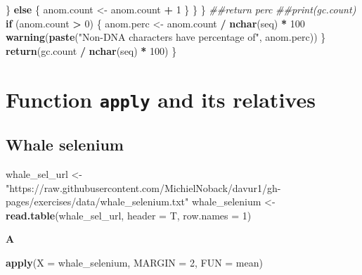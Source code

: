 \documentclass[]{book}
\newenvironment{Shaded}{\begin{snugshade}}{\end{snugshade}}
\newcommand{\CommentTok}[1]{\textcolor[rgb]{0.56,0.35,0.01}{\textit{#1}}}
\newcommand{\ControlFlowTok}[1]{\textcolor[rgb]{0.13,0.29,0.53}{\textbf{#1}}}
\newcommand{\DataTypeTok}[1]{\textcolor[rgb]{0.13,0.29,0.53}{#1}}
\newcommand{\DecValTok}[1]{\textcolor[rgb]{0.00,0.00,0.81}{#1}}
\newcommand{\KeywordTok}[1]{\textcolor[rgb]{0.13,0.29,0.53}{\textbf{#1}}}
\newcommand{\NormalTok}[1]{#1}
\newcommand{\OperatorTok}[1]{\textcolor[rgb]{0.81,0.36,0.00}{\textbf{#1}}}
\newcommand{\StringTok}[1]{\textcolor[rgb]{0.31,0.60,0.02}{#1}}
\begin{document}
\begin{Shaded}
\begin{Highlighting}[]
\NormalTok{                        \} }\ControlFlowTok{else}\NormalTok{ \{}
\NormalTok{                                anom.count <-}\StringTok{ }\NormalTok{anom.count }\OperatorTok{+}\StringTok{ }\DecValTok{1}     
\NormalTok{                        \}}
\NormalTok{                \}}
\NormalTok{        \}}
        \CommentTok{##return perc}
        \CommentTok{##print(gc.count)}
        \ControlFlowTok{if}\NormalTok{ (anom.count }\OperatorTok{>}\StringTok{ }\DecValTok{0}\NormalTok{) \{}
\NormalTok{                anom.perc <-}\StringTok{ }\NormalTok{anom.count }\OperatorTok{/}\StringTok{ }\KeywordTok{nchar}\NormalTok{(seq) }\OperatorTok{*}\StringTok{ }\DecValTok{100}
                \KeywordTok{warning}\NormalTok{(}\KeywordTok{paste}\NormalTok{(}\StringTok{"Non-DNA characters have percentage of"}\NormalTok{, anom.perc))}
\NormalTok{        \}}
        \KeywordTok{return}\NormalTok{(gc.count }\OperatorTok{/}\StringTok{ }\KeywordTok{nchar}\NormalTok{(seq) }\OperatorTok{*}\StringTok{ }\DecValTok{100}\NormalTok{)}
\NormalTok{\}}
\end{Highlighting}
\end{Shaded}

\hypertarget{function-apply-and-its-relatives-1}{%
\section{\texorpdfstring{Function \texttt{apply} and its relatives}{Function apply and its relatives}}\label{function-apply-and-its-relatives-1}}

\hypertarget{whale-selenium-1}{%
\subsection{Whale selenium}\label{whale-selenium-1}}

\begin{Shaded}
\begin{Highlighting}[]
\NormalTok{whale_sel_url <-}\StringTok{ "https://raw.githubusercontent.com/MichielNoback/davur1/gh-pages/exercises/data/whale_selenium.txt"}
\NormalTok{whale_selenium <-}\StringTok{ }\KeywordTok{read.table}\NormalTok{(whale_sel_url,}
        \DataTypeTok{header =}\NormalTok{ T,}
        \DataTypeTok{row.names =} \DecValTok{1}\NormalTok{)}
\end{Highlighting}
\end{Shaded}

\textbf{A}

\begin{Shaded}
\begin{Highlighting}[]
\KeywordTok{apply}\NormalTok{(}\DataTypeTok{X =}\NormalTok{ whale_selenium, }\DataTypeTok{MARGIN =} \DecValTok{2}\NormalTok{, }\DataTypeTok{FUN =}\NormalTok{ mean)}
\end{Highlighting}
\end{Shaded}
\end{document}
